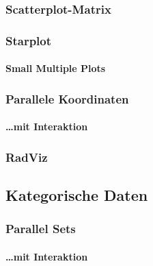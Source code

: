             \subsubsection{Scatterplot-Matrix} %

            \subsubsection{Starplot} %

                \paragraph{Small Multiple Plots} %

            \subsubsection{Parallele Koordinaten} %

                \paragraph{\dots mit Interaktion} %

            \subsubsection{RadViz} %

        \subsection{Kategorische Daten} %

            \subsubsection{Parallel Sets} %

                \paragraph{\dots mit Interaktion} %


